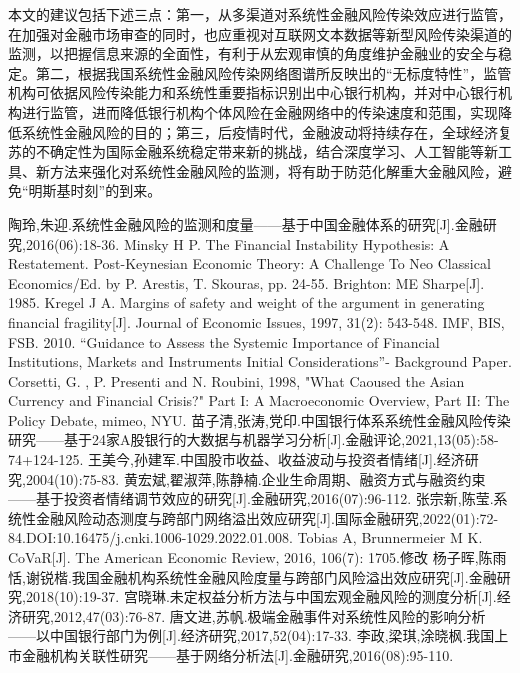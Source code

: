 \documentclass[lang=cn]{elegantpaper}
\begin{document}
本文的建议包括下述三点：第一，从多渠道对系统性金融风险传染效应进行监管，在加强对金融市场审查的同时，也应重视对互联网文本数据等新型风险传染渠道的监测，以把握信息来源的全面性，有利于从宏观审慎的角度维护金融业的安全与稳定。第二，根据我国系统性金融风险传染网络图谱所反映出的“无标度特性”，监管机构可依据风险传染能力和系统性重要指标识别出中心银行机构，并对中心银行机构进行监管，进而降低银行机构个体风险在金融网络中的传染速度和范围，实现降低系统性金融风险的目的；第三，后疫情时代，金融波动将持续存在，全球经济复苏的不确定性为国际金融系统稳定带来新的挑战，结合深度学习、人工智能等新工具、新方法来强化对系统性金融风险的监测，将有助于防范化解重大金融风险，避免“明斯基时刻”的到来。
\begin{thebibliography}{99}
    陶玲,朱迎.系统性金融风险的监测和度量——基于中国金融体系的研究[J].金融研究,2016(06):18-36.
    Minsky H P. The Financial Instability Hypothesis: A Restatement. Post-Keynesian Economic Theory: A Challenge To Neo Classical Economics/Ed. by P. Arestis, T. Skouras, pp. 24-55. Brighton: ME Sharpe[J]. 1985.
    Kregel J A. Margins of safety and weight of the argument in generating financial fragility[J]. Journal of Economic Issues, 1997, 31(2): 543-548.
    IMF, BIS, FSB. 2010. “Guidance to Assess the Systemic Importance of Financial Institutions, Markets and Instruments
    Initial Considerations”- Background Paper.
    Corsetti, G. , P. Presenti and N. Roubini, 1998, "What Caoused the Asian Currency and Financial Crisis?" Part I: A
    Macroeconomic Overview, Part II: The Policy Debate, mimeo, NYU.
    苗子清,张涛,党印.中国银行体系系统性金融风险传染研究——基于24家A股银行的大数据与机器学习分析[J].金融评论,2021,13(05):58-74+124-125.
    王美今,孙建军.中国股市收益、收益波动与投资者情绪[J].经济研究,2004(10):75-83.
    黄宏斌,翟淑萍,陈静楠.企业生命周期、融资方式与融资约束——基于投资者情绪调节效应的研究[J].金融研究,2016(07):96-112.
    张宗新,陈莹.系统性金融风险动态测度与跨部门网络溢出效应研究[J].国际金融研究,2022(01):72-84.DOI:10.16475/j.cnki.1006-1029.2022.01.008.
    Tobias A, Brunnermeier M K. CoVaR[J]. The American Economic Review, 2016, 106(7): 1705.修改
    杨子晖,陈雨恬,谢锐楷.我国金融机构系统性金融风险度量与跨部门风险溢出效应研究[J].金融研究,2018(10):19-37.
    宫晓琳.未定权益分析方法与中国宏观金融风险的测度分析[J].经济研究,2012,47(03):76-87.
    唐文进,苏帆.极端金融事件对系统性风险的影响分析——以中国银行部门为例[J].经济研究,2017,52(04):17-33.
    李政,梁琪,涂晓枫.我国上市金融机构关联性研究——基于网络分析法[J].金融研究,2016(08):95-110.

\end{thebibliography}
\end{document}
